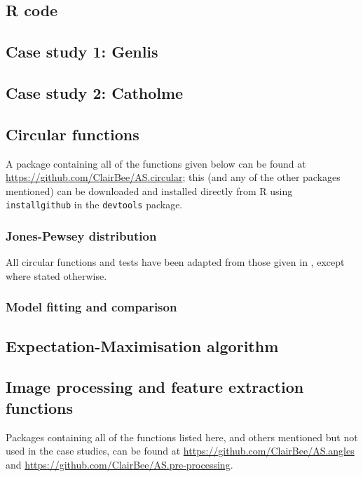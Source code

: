 \documentclass[12pt,fleqn]{article}
\numberwithin{equation}{section}
\numberwithin{figure}{section}
\numberwithin{table}{section}
\begin{document}
\begin{appendix}
\section{R code}
\label{app:R-code}

\subsection{Case study 1: Genlis}
\label{app:CS1}


\subsection{Case study 2: Catholme}
\label{app:CS2}


\subsection{Circular functions}
A package containing all of the functions given below can be found at \url{https://github.com/ClairBee/AS.circular}; this (and any of the other packages mentioned) can be downloaded and installed directly from R using \texttt{install\textunderscore github} in the \texttt{devtools} package.

\subsubsection{Jones-Pewsey distribution}
All circular functions and tests have been adapted from those given in \cite{Pewsey2014}, except where stated otherwise. 


\subsubsection{Model fitting and comparison}


\subsection{Expectation-Maximisation algorithm}


\subsection{Image processing and feature extraction functions}
Packages containing all of the functions listed here, and others mentioned but not used in the case studies, can be found at \url{https://github.com/ClairBee/AS.angles} and \url{https://github.com/ClairBee/AS.pre-processing}.




\end{appendix}

\newpage
\raggedright
\printbibliography
\end{document}
